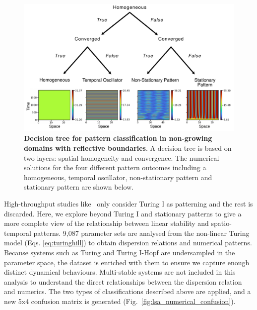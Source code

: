 \begin{figure}[H] %
    \centering
    \begin{adjustbox}{center}
    \includegraphics[width=1\textwidth]{chapters/Chapter 1/no growth classification} %
    \end{adjustbox}
    \caption{\textbf{Decision tree for pattern classification in non-growing domains with reflective boundaries}. A decision tree is based on two layers: spatial homogeneity and convergence. The numerical solutions for the four different pattern outcomes including a homogeneous, temporal oscillator, non-stationary pattern and stationary pattern are shown below.}
    \label{fig:no growth classification} %
\end{figure}


High-throughput studies like~\cite{Scholes2019, Zheng2016, Marcon} only consider Turing I as patterning and the rest is discarded.
Here, we explore beyond Turing I and stationary patterns to give a more complete view of the relationship between linear stability and spatio-temporal patterns.
9,087 parameter sets are analysed from the non-linear Turing model (Eqs. \ref{eq:turinghill}) to obtain dispersion relations and numerical patterns.
Because systems such as Turing and Turing I-Hopf are undersampled in the parameter space, the dataset is enriched with them to ensure we capture enough distinct dynamical behaviours.
Multi-stable systems are not included in this analysis to understand the direct relationships between the dispersion relation and numerics.
The two types of classifications described above are applied, and a new 5x4 confusion matrix is generated (Fig.~\ref{fig:lsa_numerical_confusion}).

